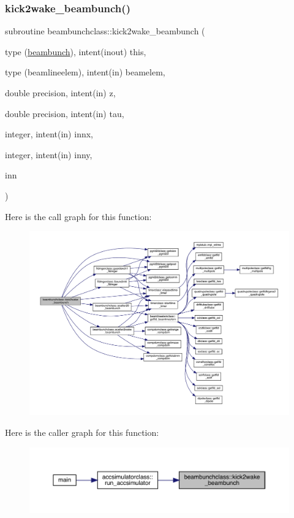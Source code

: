 \subsubsection{\texorpdfstring{kick2wake\_beambunch()}{kick2wake\_beambunch()}}
{\footnotesize\ttfamily subroutine beambunchclass\+::kick2wake\+\_\+beambunch (\begin{DoxyParamCaption}\item[{type (\mbox{\hyperlink{namespacebeambunchclass_structbeambunchclass_1_1beambunch}{beambunch}}), intent(inout)}]{this,  }\item[{type (beamlineelem), intent(in)}]{beamelem,  }\item[{double precision, intent(in)}]{z,  }\item[{double precision, intent(in)}]{tau,  }\item[{integer, intent(in)}]{innx,  }\item[{integer, intent(in)}]{inny,  }\item[{}]{inn }\end{DoxyParamCaption})}

Here is the call graph for this function\+:\nopagebreak
\begin{figure}[H]
\begin{center}
\leavevmode
\includegraphics[width=350pt]{namespacebeambunchclass_a530cca8371b8decda64389ce29d10bcd_cgraph}
\end{center}
\end{figure}
Here is the caller graph for this function\+:\nopagebreak
\begin{figure}[H]
\begin{center}
\leavevmode
\includegraphics[width=350pt]{namespacebeambunchclass_a530cca8371b8decda64389ce29d10bcd_icgraph}
\end{center}
\end{figure}
\mbox{\label{namespacebeambunchclass_a119b1d68c4a2a790014a9408c2db1575}} 
